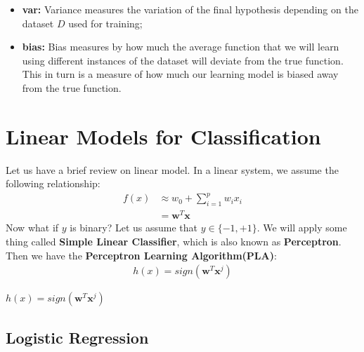 \documentclass{article}
\begin{document}
\begin{itemize}
    \item \textbf{var: }Variance measures the variation of the final hypothesis depending on the dataset $D$ used for training;
    \item \textbf{bias: }Bias measures by how much the average function that we will learn using different instances of the dataset will deviate from the true function. This in turn is a measure of how much our learning model is biased away from the true function.
\end{itemize}
\newpage


\section{Linear Models for Classification}
Let us have a brief review on linear model. In a linear system, we assume the following relationship:
\begin{align*}
    f(x) & \approx w_{0} + \sum_{i=1}^{p}w_{i}x_{i}\\
        &= \bm{w}^{T}\bm{x}
\end{align*}
Now what if $y$ is binary? Let us assume that $y\in \{-1, +1\}$. We will apply some thing called \textbf{Simple Linear Classifier}, which is also known as \textbf{Perceptron}. Then we have the \textbf{Perceptron Learning Algorithm(PLA)}:
\begin{align*}
    h(x) = sign(\bm{w}^{T}\bm{x}^{j})
\end{align*}
\begin{tcolorbox}[colback=yellow!20, colframe=yellow!90, title=Perceptron Learning Algorithm(PLA), coltitle=black]
     $h(x) = sign(\bm{w}^{T}\bm{x}^{j})$
\end{tcolorbox}

\subsection{Logistic Regression}
\end{document}
